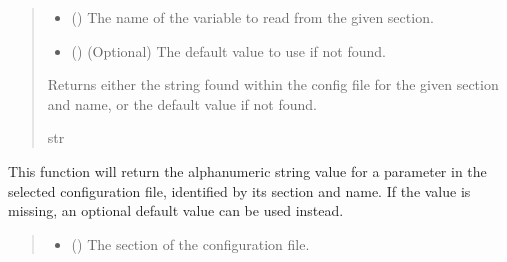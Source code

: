 \documentclass[letterpaper,10pt,english]{sphinxmanual}
\begin{document}
\begin{fulllineitems}
\begin{fulllineitems}
\begin{quote}
\begin{description}
\begin{itemize}
\item {} 
\sphinxAtStartPar
{} () \textendash{} The name of the variable to read from the given section.

\item {} 
\sphinxAtStartPar
{} () \textendash{} (Optional) The default value to use if not found.

\end{itemize}

\sphinxAtStartPar
Returns either the string found within the config file
for the given section and name, or the default value if not
found.

\sphinxAtStartPar
str

\end{description}\end{quote}

\end{fulllineitems}


\begin{fulllineitems}
\label{\detokenize{modules/input/config_handler:qnav.input.config_handler.ConfigHandler.get_str_alpha}}
\pysigstartsignatures
{}
\pysigstopsignatures
\sphinxAtStartPar
This function will return the alphanumeric string value for a
parameter in the selected configuration file, identified by its section
and name. If the value is missing, an optional default value can be
used instead.
\begin{quote}\begin{description}
\begin{itemize}
\item {} 
\sphinxAtStartPar
{} () \textendash{} The section of the configuration file.


\end{itemize}
\end{description}
\end{quote}
\end{fulllineitems}
\end{fulllineitems}
\end{document}
